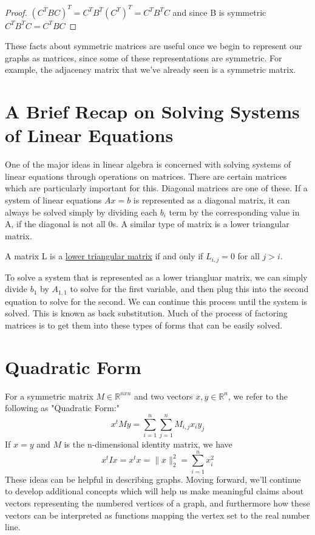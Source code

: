 \documentclass{article}
\begin{document}
    \begin{proof}
    $(C^TBC)^T = C^TB^T(C^T)^T = C^TB^TC$ and since B is symmetric $C^TB^TC = C^TBC$
    \end{proof}
    
    These facts about symmetric matrices are useful once we begin to represent our graphs as matrices, since some of these representations are symmetric. For example, the adjacency matrix that we've already seen is a symmetric matrix.
    
    \section{A Brief Recap on Solving Systems of Linear Equations}
    One of the major ideas in linear algebra is concerned with solving systems of linear equations through operations on matrices. There are certain matrices which are particularly important for this. Diagonal matrices are one of these. If a system of linear equations $Ax = b$ is represented as a diagonal matrix, it can always be solved simply by dividing each $b_i$ term by the corresponding value in A, if the diagonal is not all 0s. A similar type of matrix is a lower triangular matrix.
    
    \begin{definition}
    A matrix L is a \underline{lower triangular matrix} if and only if $L_{i,j} = 0$ for all $j > i$.
    \end{definition}
    
    To solve a system that is represented as a lower triangluar matrix, we can simply divide $b_1$ by $A_{1,1}$ to solve for the first variable, and then plug this into the second equation to solve for the second. We can continue this process until the system is solved. This is known as back substitution. Much of the process of factoring matrices is to get them into these types of forms that can be easily solved.
    
    \section{Quadratic Form}
    For a symmetric matrix $M \in \mathbb{R}^{nxn}$ and two vectors $x,y \in \mathbb{R}^{n}$, we refer to the following as "Quadratic Form:"
    $$x^{t}My = \sum_{i=1}^{n}\sum_{j=1}^{n}M_{i,j}x_{i}y_{j}$$
    If $x=y$ and $M$ is the n-dimensional identity matrix, we have
    $$x^{t}Ix = x^{t}x = \|x\|_{2}^{2} = \sum_{i=1}^{n}x_{i}^{2}$$
    These ideas can be helpful in describing graphs. Moving forward, we'll continue to develop additional concepts which will help us make meaningful claims about vectors representing the numbered vertices of a graph, and furthermore how these vectors can be interpreted as functions mapping the vertex set to the real number line.
    
\end{document}
